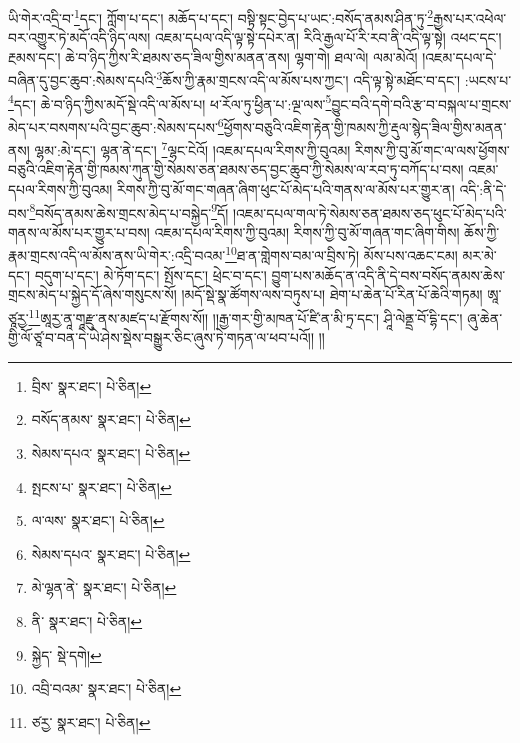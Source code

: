 ཡི་གེར་འདྲི་བ་\footnote{བྲིས་  སྣར་ཐང་།  པེ་ཅིན། }དང་། ཀློག་པ་དང་། མཆོད་པ་དང་། བསྟི་སྟང་བྱེད་པ་ཡང་:བསོད་ནམས་ཤིན་ཏུ་\footnote{བསོད་ནམས་  སྣར་ཐང་།  པེ་ཅིན། }རྒྱས་པར་འཕེལ་བར་འགྱུར་ཏེ་མདོ་འདི་ཉིད་ལས། འཇམ་དཔལ་འདི་ལྟ་སྟེ་དཔེར་ན། རིའི་རྒྱལ་པོ་རི་རབ་ནི་འདི་ལྟ་སྟེ། འཕང་དང་། རྔམས་དང་། ཆེ་བ་ཉིད་ཀྱིས་རི་ཐམས་ཅད་ཟིལ་གྱིས་མནན་ནས། ལྷག་གེ། ཐལ་ལེ། ལམ་མེའོ། །འཇམ་དཔལ་དེ་བཞིན་དུ་བྱང་ཆུབ་:སེམས་དཔའི་\footnote{སེམས་དཔའ་  སྣར་ཐང་།  པེ་ཅིན། }ཆོས་ཀྱི་རྣམ་གྲངས་འདི་ལ་མོས་པས་ཀྱང་། འདི་ལྟ་སྟེ་མཐོང་བ་དང་། :ཡངས་པ་\footnote{སྤངས་པ་  སྣར་ཐང་།  པེ་ཅིན། }དང་། ཆེ་བ་ཉིད་ཀྱིས་མདོ་སྡེ་འདི་ལ་མོས་པ། ཕ་རོལ་ཏུ་ཕྱིན་པ་:ལྔ་ལས་\footnote{ལ་ལས་  སྣར་ཐང་།  པེ་ཅིན། }བྱུང་བའི་དགེ་བའི་རྩ་བ་བསྐལ་པ་གྲངས་མེད་པར་བསགས་པའི་བྱང་ཆུབ་:སེམས་དཔས་\footnote{སེམས་དཔའ་  སྣར་ཐང་།  པེ་ཅིན། }ཕྱོགས་བཅུའི་འཇིག་རྟེན་གྱི་ཁམས་ཀྱི་རྡུལ་སྙེད་ཟིལ་གྱིས་མནན་ནས། ལྷམ་:མེ་དང་། ལྷན་ནེ་དང་། \footnote{མེ་ལྷན་ནེ་  སྣར་ཐང་།  པེ་ཅིན། }ལྷང་ངེའོ། །འཇམ་དཔལ་རིགས་ཀྱི་བུའམ། རིགས་ཀྱི་བུ་མོ་གང་ལ་ལས་ཕྱོགས་བཅུའི་འཇིག་རྟེན་གྱི་ཁམས་ཀུན་གྱི་སེམས་ཅན་ཐམས་ཅད་བྱང་ཆུབ་ཀྱི་སེམས་ལ་རབ་ཏུ་བཀོད་པ་བས། འཇམ་དཔལ་རིགས་ཀྱི་བུའམ། རིགས་ཀྱི་བུ་མོ་གང་གཞན་ཞིག་ཕུང་པོ་མེད་པའི་གནས་ལ་མོས་པར་གྱུར་ན། འདི་:ནི་དེ་བས་\footnote{ནི་  སྣར་ཐང་།  པེ་ཅིན། }བསོད་ནམས་ཆེས་གྲངས་མེད་པ་བསྐྱེད་\footnote{སྐྱེད་  སྡེ་དགེ། }དོ། །འཇམ་དཔལ་གལ་ཏེ་སེམས་ཅན་ཐམས་ཅད་ཕུང་པོ་མེད་པའི་གནས་ལ་མོས་པར་གྱུར་པ་བས། འཇམ་དཔལ་རིགས་ཀྱི་བུའམ། རིགས་ཀྱི་བུ་མོ་གཞན་གང་ཞིག་གིས། ཆོས་ཀྱི་རྣམ་གྲངས་འདི་ལ་མོས་ནས་ཡི་གེར་:འདྲི་བའམ་\footnote{འབྲི་བའམ་  སྣར་ཐང་།  པེ་ཅིན། }ཐ་ན་གླེགས་བམ་ལ་བྲིས་ཏེ། མོས་པས་འཆང་ངམ། མར་མེ་དང་། བདུག་པ་དང་། མེ་ཏོག་དང་། སྤོས་དང་། ཕྲེང་བ་དང་། བྱུག་པས་མཆོད་ན་འདི་ནི་དེ་བས་བསོད་ནམས་ཆེས་གྲངས་མེད་པ་སྐྱེད་དོ་ཞེས་གསུངས་སོ། །མདོ་སྡེ་སྣ་ཚོགས་ལས་བཏུས་པ། ཐེག་པ་ཆེན་པོ་རིན་པོ་ཆེའི་གཏམ། ཨཱ་ཙཱརྱ་\footnote{ཙརྱ་  སྣར་ཐང་།  པེ་ཅིན། }ཨཱརྱ་ནཱ་གཱརྫུ་ནས་མཛད་པ་རྫོགས་སོ།། །།རྒྱ་གར་གྱི་མཁན་པོ་ཛི་ན་མི་ཏྲ་དང་། ཤཱི་ལེནྡྲ་བོ་དྷི་དང་། ཞུ་ཆེན་གྱི་ལོ་ཙཱ་བ་བན་དེ་ཡེ་ཤེས་སྡེས་བསྒྱུར་ཅིང་ཞུས་ཏེ་གཏན་ལ་ཕབ་པའོ།། །།